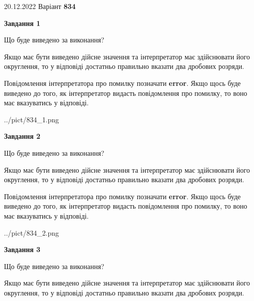 \documentclass[12pt, ukrainian]{article}
\begin{document}
{20.12.2022 Варіант \No \textbf { 834 }\par}
{
\begin {Large}

{\begin {center}\textbf{Завдання 1}\end {center}}\par
Що буде виведено за виконання? \par

Якщо має бути виведено дійсне значення та інтерпретатор має здійснювати його округлення, 
то у відповіді достатньо правильно вказати два дробових розряди.

Повідомлення інтерпретатора про помилку позначати \textbf{error}.
Якщо щось буде виведено до того, як інтерпретатор видасть повідомлення про помилку, 
то воно має вказуватись у відповіді. \par

\begin{center}
	{../pict/834_1.png}
\end{center}
\newpage

{\begin {center}\textbf{Завдання 2}\end {center}}\par
Що буде виведено за виконання? \par

Якщо має бути виведено дійсне значення та інтерпретатор має здійснювати його округлення, 
то у відповіді достатньо правильно вказати два дробових розряди.

Повідомлення інтерпретатора про помилку позначати \textbf{error}.
Якщо щось буде виведено до того, як інтерпретатор видасть повідомлення про помилку, 
то воно має вказуватись у відповіді. \par

\begin{center}
	{../pict/834_2.png}
\end{center}
\newpage

{\begin {center}\textbf{Завдання 3}\end {center}}\par
Що буде виведено за виконання? \par

Якщо має бути виведено дійсне значення та інтерпретатор має здійснювати його округлення, 
то у відповіді достатньо правильно вказати два дробових розряди.


\end{Large}}
\end{document}
